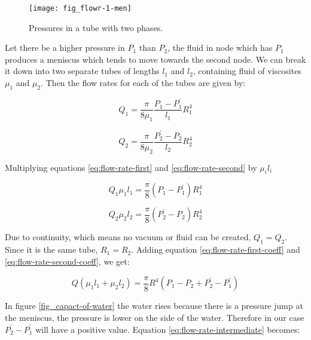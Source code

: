 	\begin{figure}[H]
		\texttt{[image: fig\_flowr-1-men]}
		\caption{Pressures in a tube with two phases.}
		\label{fig_flowr-1-men}
	\end{figure}

	Let there be a higher pressure in $P_{1}$ than $P_{2}$, the fluid in node which has $P_{1}$ produces a meniscus which tends to move towards the second node. We can break it down into two separate tubes of lengths $l_{1}$ and $l_{2}$, containing fluid of viscosites ${\mu}_1$ and ${\mu}_2$. Then the flow rates for each of the tubes are given by:
	
	\begin{equation} \label{eq:flow-rate-first}
		Q_1 = \frac{\pi}{8{\mu}_1} \frac{P_1 - P^{'}_1}{l_1} R_1^4
	\end{equation}
	
	\begin{equation} \label{eq:flow-rate-second}
		Q_2 = \frac{\pi}{8{\mu}_2} \frac{P^{'}_2 - P_2}{l_2} R_2^4
	\end{equation}

	Multiplying equations \ref{eq:flow-rate-first} and \ref{eq:flow-rate-second} by ${\mu}_i l_i$
	
	\begin{equation} \label{eq:flow-rate-first-coeff}
		Q_1 {\mu}_1 l_1 = \frac{\pi}{8} (P_1 - P^{'}_1) R_1^4
	\end{equation}
	
	\begin{equation} \label{eq:flow-rate-second-coeff}
		Q_2 {\mu}_2 l_2 = \frac{\pi}{8} (P^{'}_2 - P_2) R_2^4
	\end{equation}

	Due to continuity, which means no vacuum or fluid can be created, $Q_1 = Q_2$. Since it is the same tube, $R_1 = R_2$. Adding equation \ref{eq:flow-rate-first-coeff} and \ref{eq:flow-rate-second-coeff}, we get:
	
	\begin{equation} \label{eq:flow-rate-intermediate}
		Q({\mu}_1 l_1 + {\mu}_2 l_2) = \frac{\pi}{8}R^4(P_1 - P_2 + P^{'}_2 - P^{'}_1)
	\end{equation}

	In figure \ref{fig_capact-of-water} the water rises because there is a pressure jump at the meniscus, the pressure is lower on the side of the water. Therefore in our case $P^{'}_2 - P^{'}_1$ will have a positive value. Equation \ref{eq:flow-rate-intermediate} becomes:
	
